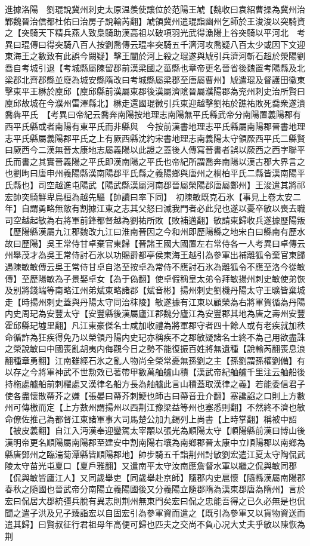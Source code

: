 進據洛陽　劉琨說冀州刺史太原温羨使讓位於范陽王虓【魏收曰袁紹曹操為冀州治鄴魏晉治信都杜佑曰治房子說輸芮翻】虓領冀州遣琨詣幽州乞師於王浚浚以突騎資之【突騎天下精兵燕人致梟騎助漢高祖以破項羽光武得漁陽上谷突騎以平河北　考異曰琨傳曰得突騎八百人按劉喬傳云琨率突騎五千濟河攻喬疑八百太少或因下文迎東海王之數致有此誤今闕疑】擊王闡於河上殺之琨遂與虓引兵濟河斬石超於滎陽劉喬自考城引退【考城縣屬陳留郡前漢梁國之菑縣也章帝更名晉省後魏置考陽縣及北梁郡北齊郡縣並廢為城安縣隋改曰考城縣屬梁郡至唐屬曹州】虓遣琨及督護田徽東擊東平王楙於廩邱【廩邱縣前漢屬東郡後漢屬濟隂晉屬濮陽郡為兖州刺史治所賢曰廩邱故城在今濮州雷澤縣北】楙走還國琨徽引兵東迎越擊劉祐於譙祐敗死喬衆遂潰喬犇平氏　【考異曰帝紀云喬奔南陽按地理志南陽無平氏縣武帝分南陽置義陽郡有西平氏縣或者南陽有東平氏而非縣與　今按前漢書地理志平氏縣屬南陽郡晉書地理志平氏縣屬義陽郡平氏之上有厥西縣沈約宋書地理志南義陽太守領厥西平氏二縣賢曰厥西今二漢無晉太康地志屬義陽以此證之蓋後人傳寫晉書者誤以厥西之西字聯平氏而書之其實晉義陽之平氏即漢南陽之平氏也帝紀所謂喬奔南陽以漢古郡大界言之也劉昫曰唐申州義陽縣漢南陽郡平氏縣之義陽鄉與唐州之桐柏平氏二縣皆漢南陽平氏縣也】司空越進屯陽武【陽武縣漢屬河南郡晉屬榮陽郡唐屬鄭州】王浚遣其將祁宏帥突騎鮮卑烏桓為越先驅【帥讀曰率下同】　初陳敏既克石氷【事見上卷太安二年】自謂勇略無敵有割據江東之志其父怒曰滅我門者必此兒也遂以憂卒敏以喪去職司空越起敏為右將軍前鋒都督越為劉祐所敗【敗補邁翻】敏請東歸收兵遂據歷陽叛【歷陽縣漢屬九江郡魏改九江曰淮南晉因之今和州即歷陽縣之地宋白曰縣南有歷水故曰歷陽】吳王常侍甘卓棄官東歸【晉諸王國大國置左右常侍各一人考異曰卓傳云州舉茂才為吳王常侍討石氷以功賜爵都亭侯東海王越引為參軍出補離狐令棄官東歸遇陳敏敏傳云吳王常侍甘卓自洛至按卓為常侍不應討石氷為離狐令不應至洛今從敏傳】至歷陽敏為子景娶卓女【為于偽翻】使卓假稱皇太弟令拜敏揚州刺史敏使弟恢及别將錢端等南略江州弟斌東略諸郡【斌音彬】揚州刺史劉機丹陽太守王曠皆棄城走【時揚州刺史蓋與丹陽太守同治秣陵】敏遂據有江東以顧榮為右將軍賀循為丹陽内史周玘為安豐太守【安豐縣後漢屬廬江郡魏分廬江為安豐郡其地為唐之壽州安豐霍邱縣玘墟里翻】凡江東豪傑名士咸加收禮為將軍郡守者四十餘人或有老疾就加秩命循詐為狂疾得免乃以榮領丹陽内史玘亦稱疾不之郡敏疑諸名士終不為己用欲盡誅之榮說敏曰中國喪亂胡夷内侮觀今日之勢不能復振百姓將無遺種【說輸芮翻喪息浪翻種章勇翻】江南雖經石氷之亂人物尚全榮常憂無孫劉之主【孫劉謂孫權劉備】有以存之今將軍神武不世勲效已著帶甲數萬舳艫山積【漢武帝紀舳艫千里注云舳船後持柂處艫船前刺櫂處又漢律名船方長為舳艫此言山積蓋取漢律之義】若能委信君子使各盡懷散蔕芥之嫌【張晏曰蔕芥刺鯁也師古曰蔕音丑介翻】塞讒諂之口則上方數州可傳檄而定【上方數州謂揚州以西荆江豫梁益等州也塞悉則翻】不然終不濟也敏命僚佐推己為都督江東諸軍事大司馬楚公加九錫列上尚書【上時掌翻】稱被中詔【被皮義翻】自江入沔漢奉迎鑾駕太宰顒以張光為順陽太守【順陽縣前漢曰博山後漢明帝更名順陽屬南陽郡至建安中割南陽右壤為南鄉郡晉太康中立順陽郡以南鄉為縣唐鄧州之臨湍菊潭縣皆順陽郡地】帥步騎五千詣荆州討敏劉宏遣江夏太守陶侃武陵太守苗光屯夏口【夏戶雅翻】又遣南平太守汝南應詹督水軍以繼之侃與敏同郡【侃與敏皆廬江人】又同歲舉吏【同歲舉赴京師】隨郡内史扈懷【隨縣漢屬南陽郡春秋之隨國也晉武帝分南陽立義陽國後又分義陽立隨郡隋為漢東郡唐為隋州】言於宏曰侃居大郡統彊兵脫有異志則荆州無東門矣宏曰侃之忠能吾得之已久必無是也侃聞之遣子洪及兄子臻詣宏以自固宏引為參軍資而遣之【既引為參軍又以貨物資送而遣其歸】曰賢叔征行君祖母年高便可歸也匹夫之交尚不負心况大丈夫乎敏以陳恢為荆